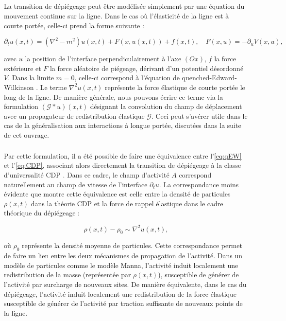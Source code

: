 \subparagraph{}La transition de dépiégeage peut être modélisée simplement par une équation du mouvement continue sur la ligne. Dans le cas où l'élasticité de la ligne est à courte portée, celle-ci prend la forme suivante \cite{fisher_collective_1998, wiese_theory_2022} :

\begin{equation}
	\partial_t u (x,t) = (\nabla^2 - m^2)u(x,t) + F(x, u(x,t)) + f(x,t), \quad F(x,u) = - \partial_u V(x,u),
	\label{eq:qEW}
\end{equation}

\noindent avec $u$ la position de l'interface perpendiculairement à l'axe $(Ox)$, $f$ la force extérieure et $F$ la force aléatoire de piégeage, dérivant d'un potentiel désordonné $V$. Dans la limite $m=0$, celle-ci correspond à l'équation de quenched-Edward-Wilkinson \cite{nattermann_dynamics_1992}. Le terme $\nabla^2 u (x,t)$ représente la force élastique de courte portée le long de la ligne. De manière générale, nous pouvons écrire ce terme via la formulation $(\mathcal{G}\ast u) (x,t)$ désignant la convolution du champ de déplacement avec un propagateur de redistribution élastique $\mathcal{G}$. Ceci peut s'avérer utile dans le cas de la généralisation aux interactions à longue portée, discutées dans la suite de cet ouvrage.

\subparagraph{}Par cette formulation, il a été possible de faire une équivalence entre l'\autoref{eq:qEW} et l'\autoref{eq:CDP}, associant alors directement la transition de dépiégeage à la classe d'universalité CDP \cite{le_doussal_exact_2015, wiese_hyperuniformity_2024}. Dans ce cadre, le champ d'activité $A$ correspond naturellement au champ de vitesse de l'interface $\partial_t u$. La correspondance moins évidente que montre cette équivalence est celle entre la densité de particules $\rho(x,t)$ dans la théorie CDP et la force de rappel élastique dans le cadre théorique du dépiégeage :

\begin{equation}
	\rho(x,t) - \rho_0 \sim \nabla^2 u (x,t),
	\label{eq:equivCDPdépiégeage}
\end{equation}

\noindent où $\rho_0$ représente la densité moyenne de particules. Cette correspondance permet de faire un lien entre les deux mécanismes de propagation de l'activité. Dans un modèle de particules comme le modèle Manna, l'activité induit localement une redistribution de la masse (représentée par $\rho(x,t)$), susceptible de générer de l'activité par surcharge de nouveaux sites. De manière équivalente, dans le cas du dépiégeage, l'activité induit localement une redistribution de la force élastique susceptible de générer de l'activité par traction suffisante de nouveaux points de la ligne.

